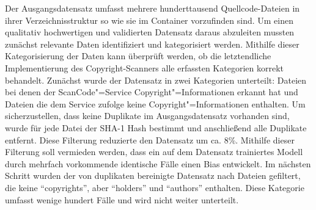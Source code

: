 Der Ausgangsdatensatz umfasst mehrere hunderttausend Quellcode-Dateien in ihrer Verzeichnisstruktur so wie sie im Container vorzufinden sind.
Um einen qualitativ hochwertigen und validierten Datensatz daraus abzuleiten mussten zunächst relevante Daten identifiziert und kategorisiert werden.
Mithilfe dieser Kategorisierung der Daten kann überprüft werden, ob die letztendliche Implementierung des Copyright-Scanners alle erfassten Kategorien korrekt behandelt.
Zunächst wurde der Datensatz in zwei Kategorien unterteilt: Dateien bei denen der ScanCode"=Service Copyright"=Informationen erkannt hat und Dateien die dem Service zufolge keine Copyright"=Informationen enthalten.
Um sicherzustellen, dass keine Duplikate im Ausgangsdatensatz vorhanden sind, wurde für jede Datei der SHA-1 Hash bestimmt und anschließend alle Duplikate entfernt.
Diese Filterung reduzierte den Datensatz um ca. 8\%.
Mithilfe dieser Filterung soll vermieden werden, dass ein auf dem Datensatz trainiertes Modell durch mehrfach vorkommende identische Fälle einen Bias entwickelt.
Im nächsten Schritt wurden der von duplikaten bereinigte Datensatz nach Dateien gefiltert, die keine \enquote{copyrights}, aber \enquote{holders} und \enquote{authors} enthalten.
Diese Kategorie umfasst wenige hundert Fälle und wird nicht weiter unterteilt.


